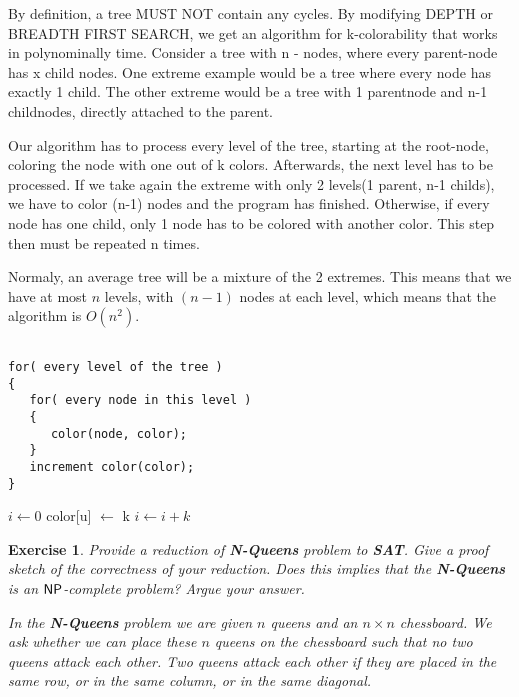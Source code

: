 \documentclass [11pt]{article}
\newenvironment{mylisting}
{\begin{list}{}{\setlength{\leftmargin}{1em}}\item\scriptsize\bfseries}
{\end{list}}
\newtheorem{exercise}[theorem]{Exercise}
\newcommand{\ccfont}[1]{\protect\mathsf{#1}}
\newcommand{\NP}{\ccfont{NP}}
\newcommand{\solution}[1]{\noindent {\bf Solution.}  #1}
\begin{document}
\solution

By definition, a tree MUST NOT contain any cycles. By modifying DEPTH or BREADTH FIRST SEARCH, we get an algorithm for k-colorability that works in polynominally time. Consider a tree with n - nodes, where every parent-node has x child nodes. One extreme example would be a tree where every node has exactly 1 child. The other extreme would be a tree with 1 parentnode and n-1 childnodes, directly attached to the parent.

Our algorithm has to process every level of the tree, starting at the root-node, coloring the node with one out of k colors. Afterwards, the next level has to be processed. If we take again the extreme with only 2 levels(1 parent, n-1 childs), we have to color (n-1) nodes and the program has finished. Otherwise, if every node has one child, only 1 node has to be colored with another color. This step then must be repeated n times.

Normaly, an average tree will be a mixture of the 2 extremes. This means that we have at most $n$ levels, with $(n-1)$ nodes at each level, which means that the algorithm is $O(n^2)$.  

\begin{mylisting}
\begin{verbatim}

for( every level of the tree )
{
   for( every node in this level )
   {
      color(node, color);
   }
   increment color(color);
}

\end{verbatim}
\end{mylisting}

\begin{algorithmic}
    \State $i\gets 0$
    color[u] $\gets$ k
        \State $i\gets i+k$
    \EndIf
\EndFor
\EndFunction
\end{algorithmic}


\begin{exercise}
  \label{ex:Nqueens}
  Provide a reduction of \textbf{N-Queens} problem to \textbf{SAT}. Give a proof sketch of the correctness of your reduction. Does this implies that the \textbf{N-Queens} is an $\NP$-complete problem? Argue your answer.  
  
  \smallskip 
  
\noindent In the \textbf{N-Queens} problem we are given $n$ queens and an $n \times n$ chessboard. We ask whether we can place these $n$ queens on the  chessboard such that no two queens attack each other. Two queens attack each other if they are placed in the same row, or in the same column, or in the same diagonal.    
       
   
\end{exercise}
\end{document}

